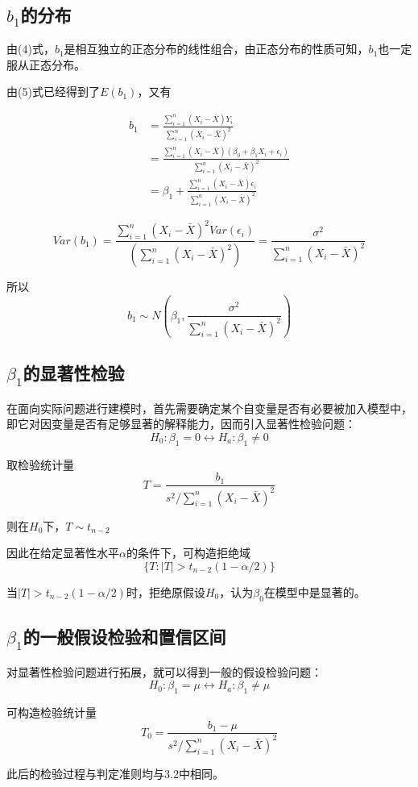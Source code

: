 \documentclass[UTF8]{ctexart}
\begin{document}
\subsection{$b_1$的分布}
由(4)式，$b_1$是相互独立的正态分布的线性组合，由正态分布的性质可知，$b_1$也一定服从正态分布。

由(5)式已经得到了$E(b_1)$，又有

\begin{align*}
b_1&=\frac{\sum_{i=1}^n(X_i-\bar{X})Y_i}{\sum_{i=1}^n(X_i-\bar{X})^2}\\
&=\frac{\sum_{i=1}^n(X_i-\bar{X})(\beta_0+\beta_1X_i+\epsilon_i)}{\sum_{i=1}^n(X_i-\bar{X})^2}\\
&=\beta_1+\frac{\sum_{i=1}^n(X_i-\bar{X})\epsilon_i}{\sum_{i=1}^n(X_i-\bar{X})^2}
\end{align*}

$$Var(b_1)=\frac{\sum_{i=1}^n(X_i-\bar{X})^2Var(\epsilon_i)}{(\sum_{i=1}^n(X_i-\bar{X})^2)}=\frac{\sigma^2}{\sum_{i=1}^n(X_i-\bar{X})^2}$$


所以
\begin{equation}
    b_1\sim N(\beta_1,\frac{\sigma^2}{\sum_{i=1}^n(X_i-\bar{X})^2})
\end{equation}

\subsection{$\beta_1$的显著性检验}
在面向实际问题进行建模时，首先需要确定某个自变量是否有必要被加入模型中，即它对因变量是否有足够显著的解释能力，因而引入显著性检验问题：
$$H_0:\beta_1=0\leftrightarrow H_a:\beta_1\ne0$$

取检验统计量
$$T=\frac{b_1}{s^2/\sum_{i=1}^n(X_i-\bar{X})^2}$$

则在$H_0$下，$T\sim t_{n-2}$

因此在给定显著性水平$\alpha$的条件下，可构造拒绝域
$$\{T: |T|>t_{n-2}(1-\alpha/2)\}$$

当$|T|>t_{n-2}(1-\alpha/2)$时，拒绝原假设$H_0$，认为$\beta_0$在模型中是显著的。


\subsection{$\beta_1$的一般假设检验和置信区间}
对显著性检验问题进行拓展，就可以得到一般的假设检验问题：
$$H_0:\beta_1=\mu\leftrightarrow H_a:\beta_1\ne\mu$$

可构造检验统计量
$$T_0=\frac{b_1-\mu}{s^2/\sum_{i=1}^n(X_i-\bar{X})^2}$$

此后的检验过程与判定准则均与3.2中相同。
\end{document}
